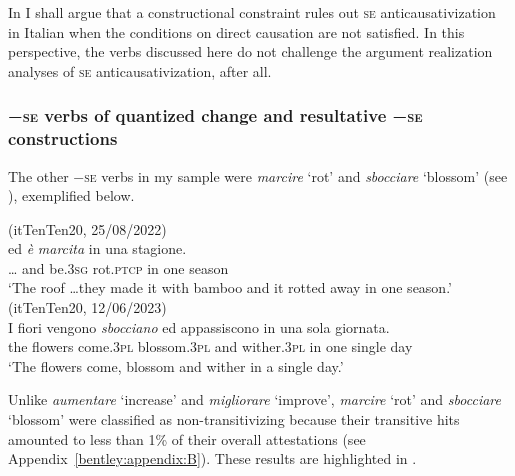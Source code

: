 \documentclass[output=paper,colorlinks,citecolor=brown
]{langscibook}
\begin{document}
In  I shall argue that a constructional constraint rules out \textsc{se} anticausativization in Italian when the conditions on direct causation are not satisfied. In this perspective, the verbs discussed here do not challenge the argument realization analyses of \textsc{se} anticausativization, after all.

\subsubsection{−\textsc{se} verbs of quantized change and resultative −\textsc{se} constructions}
\label{bentley_section_3.3.2}

The other −\textsc{se} verbs in my sample were \textit{marcire} ‘rot’ and \textit{sbocciare} ‘blossom’ (see ), exemplified below.

\ea \label{bentley_example_14}(itTenTen20, 25/08/2022)\\
    ed		\textit{è} 					\textit{marcita}	in	una	stagione.  \\
 {\ldots} 				and	be.3\textsc{sg}	rot.\textsc{ptcp}		in	one	season \\
    \glt 			‘The roof  \ldots  they made it with bamboo and it rotted away in one season.’
\ex \label{bentley_example_15}(itTenTen20, 12/06/2023)\\
    \gll I			fiori				vengono		\textit{sbocciano}				ed		appassiscono	in 	una sola			giornata. \\
 the	flowers	come.3\textsc{pl}		blossom.3\textsc{pl}	and	wither.3\textsc{pl}				in		one	single	day \\
    \glt 				‘The flowers come, blossom and wither in a single day.’
\z

Unlike \textit{aumentare} ‘increase’ and \textit{migliorare} ‘improve’, \textit{marcire} ‘rot’ and \textit{sbocciare} ‘blossom’ were classified as non-transitivizing because their transitive hits amounted to less than 1\% of their overall attestations (see Appendix~\ref{bentley:appendix:B}). These results are highlighted in .
\end{document}
